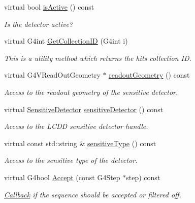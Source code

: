 \begin{DoxyCompactItemize}
virtual bool \hyperlink{class_d_d4hep_1_1_simulation_1_1_geant4_sens_det_a862cd7e6673249aaf71da2eda32c4777}{isActive} () const 
\begin{DoxyCompactList}\small\item\em Is the detector active? \item\end{DoxyCompactList}\item 
virtual G4int \hyperlink{class_d_d4hep_1_1_simulation_1_1_geant4_sens_det_acabf73f9ac2fd034b02bb24d12db8347}{GetCollectionID} (G4int i)
\begin{DoxyCompactList}\small\item\em This is a utility method which returns the hits collection ID. \item\end{DoxyCompactList}\item 
virtual G4VReadOutGeometry $\ast$ \hyperlink{class_d_d4hep_1_1_simulation_1_1_geant4_sens_det_a93a6d9cf9b58769cc5404762690cb3bc}{readoutGeometry} () const 
\begin{DoxyCompactList}\small\item\em Access to the readout geometry of the sensitive detector. \item\end{DoxyCompactList}\item 
virtual \hyperlink{class_d_d4hep_1_1_geometry_1_1_sensitive_detector}{SensitiveDetector} \hyperlink{class_d_d4hep_1_1_simulation_1_1_geant4_sens_det_ad55354b08f476e29a9195be11e4dbe8c}{sensitiveDetector} () const 
\begin{DoxyCompactList}\small\item\em Access to the LCDD sensitive detector handle. \item\end{DoxyCompactList}\item 
virtual const std::string \& \hyperlink{class_d_d4hep_1_1_simulation_1_1_geant4_sens_det_a4a615f712c4ec113a536e3b6ffeb3c67}{sensitiveType} () const 
\begin{DoxyCompactList}\small\item\em Access to the sensitive type of the detector. \item\end{DoxyCompactList}\item 
virtual G4bool \hyperlink{class_d_d4hep_1_1_simulation_1_1_geant4_sens_det_a3b7e7be391162d604279c2e52a46d1df}{Accept} (const G4Step $\ast$step) const 
\begin{DoxyCompactList}\small\item\em \hyperlink{class_d_d4hep_1_1_callback}{Callback} if the sequence should be accepted or filtered off. \item\end{DoxyCompactList}\item 

\end{DoxyCompactItemize}
